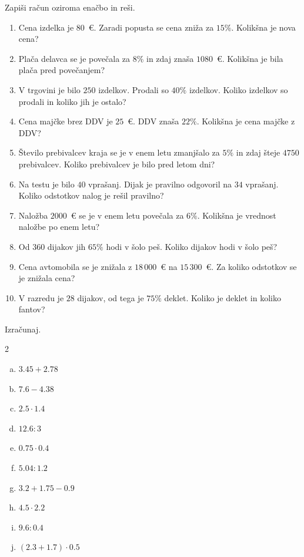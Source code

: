 \documentclass[a4paper,12pt]{letter}
\begin{document}
\begin{naloga}
Zapi\v{s}i ra\v{c}un oziroma ena\v{c}bo in re\v{s}i.

\begin{enumerate}[1.)]
\item Cena izdelka je $80$~\euro{}. Zaradi popusta se cena zni\v{z}a za $15\%$. Kolik\v{s}na je nova cena?
\item Pla\v{c}a delavca se je pove\v{c}ala za $8\%$ in zdaj zna\v{s}a $1080$~\euro{}. Kolik\v{s}na je bila pla\v{c}a pred pove\v{c}anjem?
\item V trgovini je bilo $250$ izdelkov. Prodali so $40\%$ izdelkov. Koliko izdelkov so prodali in koliko jih je ostalo?
\item Cena maj\v{c}ke brez DDV je $25$~\euro{}. DDV zna\v{s}a $22\%$. Kolik\v{s}na je cena maj\v{c}ke z DDV?
\item \v{S}tevilo prebivalcev kraja se je v enem letu zmanj\v{s}alo za $5\%$ in zdaj \v{s}teje $4750$ prebivalcev. Koliko prebivalcev je bilo pred letom dni?
\item Na testu je bilo $40$ vpra\v{s}anj. Dijak je pravilno odgovoril na $34$ vpra\v{s}anj. Koliko odstotkov nalog je re\v{s}il pravilno?
\item Nalo\v{z}ba $2000$~\euro{} se je v enem letu pove\v{c}ala za $6\%$. Kolik\v{s}na je vrednost nalo\v{z}be po enem letu?
\item Od $360$ dijakov jih $65\%$ hodi v \v{s}olo pe\v{s}. Koliko dijakov hodi v \v{s}olo pe\v{s}?
\item Cena avtomobila se je zni\v{z}ala z $18\,000$~\euro{} na $15\,300$~\euro{}. Za koliko odstotkov se je zni\v{z}ala cena?
\item V razredu je $28$ dijakov, od tega je $75\%$ deklet. Koliko je deklet in koliko fantov?
\end{enumerate}
\end{naloga}
\newpage

\begin{naloga}
Izra\v{c}unaj.

\begin{multicols}{2}
\begin{enumerate}[a.)]
\item $3.45+2.78$
\item $7.6-4.38$
\item $2.5\cdot1.4$
\item $12.6:3$
\item $0.75\cdot0.4$
\item $5.04:1.2$
\item $3.2+1.75-0.9$
\item $4.5\cdot2.2$
\item $9.6:0.4$
\item $(2.3+1.7)\cdot0.5$
\end{enumerate}
\end{multicols}
\end{naloga}
\end{document}
